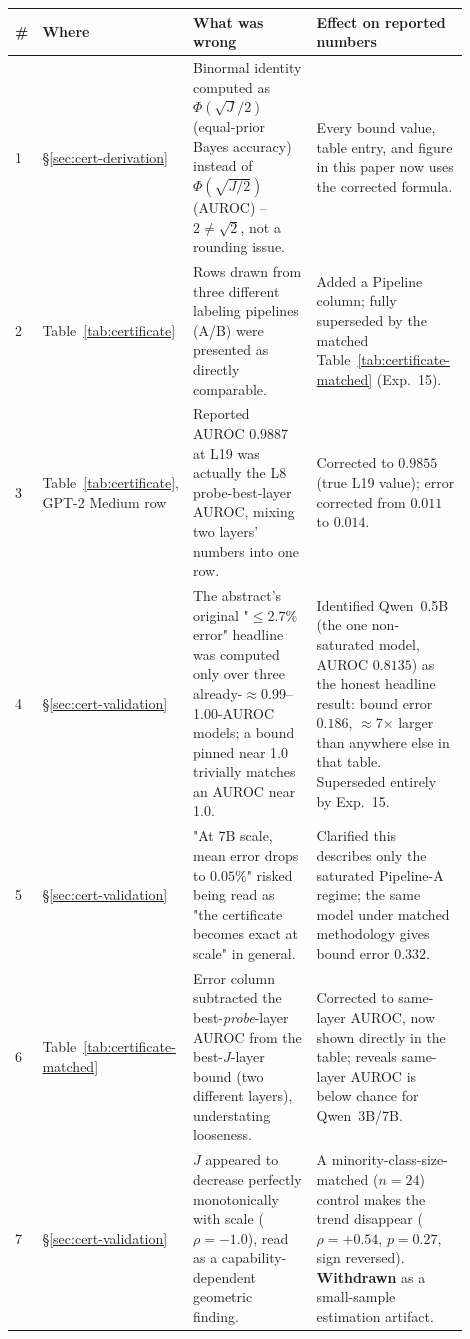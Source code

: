 \documentclass[onecolumn]{jmlr}
\begin{document}
\begin{longtable}{p{0.04\linewidth}p{0.16\linewidth}p{0.35\linewidth}p{0.35\linewidth}}
\toprule
\textbf{\#} & \textbf{Where} & \textbf{What was wrong} & \textbf{Effect on reported numbers} \\
\midrule
\endhead
1 & \S\ref{sec:cert-derivation} & Binormal identity computed as $\Phi(\sqrt J/2)$ (equal-prior Bayes accuracy) instead of $\Phi(\sqrt{J/2})$ (AUROC) -- $2\neq\sqrt2$, not a rounding issue. & Every bound value, table entry, and figure in this paper now uses the corrected formula. \\
2 & Table~\ref{tab:certificate} & Rows drawn from three different labeling pipelines (A/B) were presented as directly comparable. & Added a Pipeline column; fully superseded by the matched Table~\ref{tab:certificate-matched} (Exp.~15). \\
3 & Table~\ref{tab:certificate}, GPT-2 Medium row & Reported AUROC $0.9887$ at L19 was actually the L8 probe-best-layer AUROC, mixing two layers' numbers into one row. & Corrected to $0.9855$ (true L19 value); error corrected from $0.011$ to $0.014$. \\
4 & \S\ref{sec:cert-validation} & The abstract's original "$\leq2.7\%$ error" headline was computed only over three already-$\approx$0.99--1.00-AUROC models; a bound pinned near 1.0 trivially matches an AUROC near 1.0. & Identified Qwen~0.5B (the one non-saturated model, AUROC $0.8135$) as the honest headline result: bound error $0.186$, $\approx$7$\times$ larger than anywhere else in that table. Superseded entirely by Exp.~15. \\
5 & \S\ref{sec:cert-validation} & "At 7B scale, mean error drops to $0.05\%$" risked being read as "the certificate becomes exact at scale" in general. & Clarified this describes only the saturated Pipeline-A regime; the same model under matched methodology gives bound error $0.332$. \\
6 & Table~\ref{tab:certificate-matched} & Error column subtracted the best-\emph{probe}-layer AUROC from the best-$J$-layer bound (two different layers), understating looseness. & Corrected to same-layer AUROC, now shown directly in the table; reveals same-layer AUROC is below chance for Qwen~3B/7B. \\
7 & \S\ref{sec:cert-validation} & $J$ appeared to decrease perfectly monotonically with scale ($\rho=-1.0$), read as a capability-dependent geometric finding. & A minority-class-size-matched ($n{=}24$) control makes the trend disappear ($\rho=+0.54$, $p=0.27$, sign reversed). \textbf{Withdrawn} as a small-sample estimation artifact. \\

\end{longtable}
\end{document}
